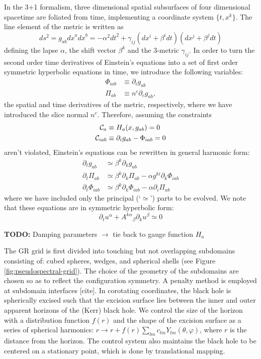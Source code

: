 In the 3+1 formalism, three dimensional spatial subsurfaces of four dimensional spacetime are foliated from time, implementing a coordinate system $\{t, x^k\}$.  The line element of the metric is written as
\begin{equation}
ds^2 = g_{ab} {dx}^a {dx}^b = -\alpha^2 {dt}^2 + \gamma_{ij} (dx^i + \beta^i dt) (dx^j + \beta^j dt)
\end{equation} 
defining the lapse $\alpha$, the shift vector $\beta^k$ and the 3-metric $\gamma_{ij}$. 
In order to turn the second order time derivatives of Einstein's equations into a set of first order symmetric hyperbolic equations in time, we introduce the following variables:
\begin{align}
\Phi_{iab} &\equiv \partial_i g_{ab} \\
\Pi_{ab} &\equiv n^c \partial_c g_{ab},
\end{align}
the spatial and time derivatives of the metric, respectively, where we have introduced the slice normal $n^c$.  
Therefore, assuming the constraints
\begin{align}
{\cal{C}}_a &\equiv H_a (x, g_{ab} ) = 0 \\
{\cal{C}}_{iab} &\equiv \partial_i g_{ab} - \Phi_{iab} = 0
\end{align}
aren't violated, Einstein's equations can be rewritten in general harmonic form:
\begin{align}
\partial_t g_{ab} &\simeq \beta^k \partial_k g_{ab} \\
\partial_t \Pi_{ab} &\simeq \beta^k \partial_k \Pi_{ab} - \alpha g^{ki} \partial_k \Phi_{iab} \\
\partial_t \Phi_{iab} &\simeq \beta^k \partial_k \Phi_{iab} - \alpha  \partial_i \Pi_{ab}
\end{align}
where we have included only the principal (`$\simeq$') parts to be evolved.  We note that these equations are in symmetric hyperbolic form:
\begin{equation}
\partial_t u^\alpha + {A^{k\alpha}}_\beta \partial_k u^\beta \simeq 0
\end{equation}



\textbf{TODO:} Damping parameters $\rightarrow$ tie back to gauge function $H_a$


The GR grid is first divided into touching but not overlapping subdomains consisting of: cubed spheres, wedges, and spherical shells (see Figure \ref{fig:pseudospectral-grid}).  The choice of the geometry of the subdomains are chosen so as to reflect the configuration symmetry.  A penalty method is employed at subdomain interfaces [cite].  In corotating coordinates, the black hole is spherically excised such that the excision surface lies between the inner and outer apparent horizons of the (Kerr) black hole.  We control the size of the horizon with a distribution function $f(r)$ and the shape of the excision surface as a series of spherical harmonics: $r \rightarrow r + f(r) \sum_{lm} { c_{lm} Y_{lm}(\theta, \varphi) }$, where $r$ is the distance from the horizon.  The control system also maintains the black hole to be centered on a stationary point, which is done by translational mapping.  

